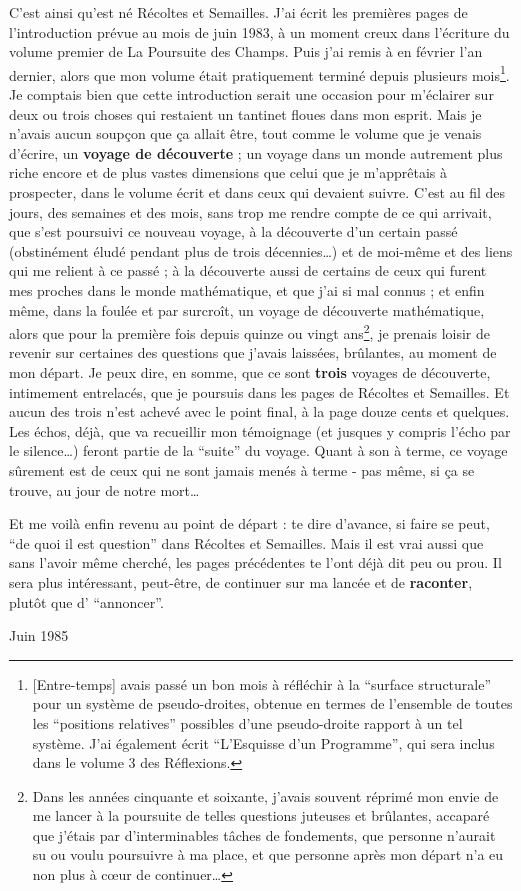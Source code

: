 C'est ainsi qu'est né Récoltes et Semailles. J'ai écrit les premières pages de l'introduction prévue au mois de juin 1983, à un moment creux dans l'écriture du volume premier de La Poursuite des Champs. Puis j'ai remis à en février l'an dernier, alors que mon volume était pratiquement terminé depuis plusieurs mois\footnote{[Entre-temps] avais passé un bon mois à réfléchir à la ``surface structurale'' pour un système de pseudo-droites, obtenue en termes de l'ensemble de toutes les ``positions relatives'' possibles d'une pseudo-droite rapport à un tel système. J'ai également écrit ``L'Esquisse d'un Programme'', qui sera inclus dans le volume 3 des Réflexions.}. Je comptais bien que cette introduction serait une occasion pour m'éclairer sur deux ou trois choses qui restaient un tantinet floues dans mon esprit. Mais je n'avais aucun soupçon que ça allait être, tout comme le volume que je venais d'écrire, un \textbf{voyage de découverte} ; un voyage dans un monde autrement plus riche encore et de plus vastes dimensions que celui que je m'apprêtais à prospecter, dans le volume écrit et dans ceux qui devaient suivre. C'est au fil des jours, des semaines et des mois, sans trop me rendre compte de ce qui arrivait, que s'est poursuivi ce nouveau voyage, à la découverte d'un certain passé (obstinément éludé pendant plus de trois décennies\ldots) et de moi-même et des liens qui me relient à ce passé ; à la découverte aussi de certains de ceux qui furent mes proches dans le monde mathématique, et que j'ai si mal connus ; et enfin même, dans la foulée et par surcroît, un voyage de découverte mathématique, alors que pour la première fois depuis quinze ou vingt ans\footnote{Dans les années cinquante et soixante, j'avais souvent réprimé mon envie de me lancer à la poursuite de telles questions juteuses et brûlantes, accaparé que j'étais par d'interminables tâches de fondements, que personne n'aurait su ou voulu poursuivre à ma place, et que personne après mon départ n'a eu non plus à cœur de continuer\ldots}, je prenais loisir de revenir sur certaines des questions que j'avais laissées, brûlantes, au moment de mon départ. Je peux dire, en somme, que ce sont \textbf{trois} voyages de découverte, intimement entrelacés, que je poursuis dans les pages de Récoltes et Semailles. Et aucun des trois n'est achevé avec le point final, à la page douze cents et quelques. Les échos, déjà, que va recueillir mon témoignage (et jusques y compris l'écho par le silence\ldots) feront partie de la ``suite'' du voyage. Quant à son à terme, ce voyage sûrement est de ceux qui ne sont jamais menés à terme - pas même, si ça se trouve, au jour de notre mort\ldots

Et me voilà enfin revenu au point de départ : te dire d'avance, si faire se peut, ``de quoi il est question'' dans Récoltes et Semailles. Mais il est vrai aussi que sans l'avoir même cherché, les pages précédentes te l'ont déjà dit peu ou prou. Il sera plus intéressant, peut-être, de continuer sur ma lancée et de \textbf{raconter}, plutôt que d' ``annoncer''.

\begin{flushright}
Juin 1985
\end{flushright}


